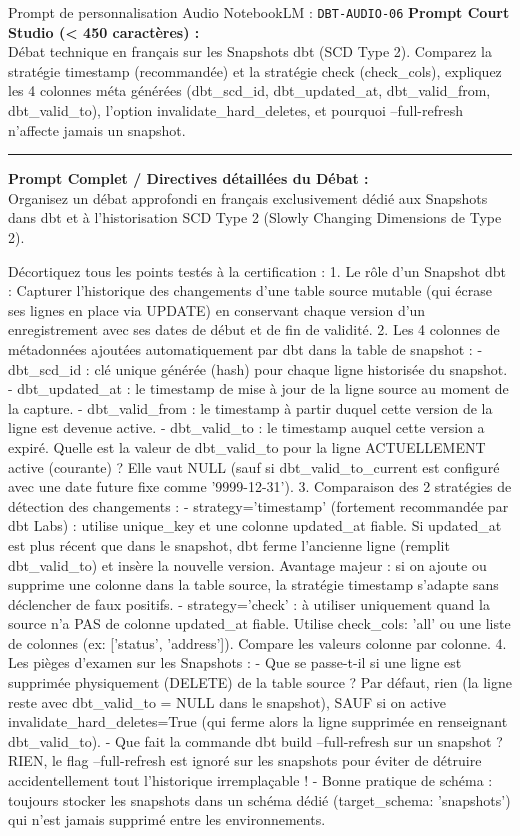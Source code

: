 \documentclass[11pt,a4paper]{article}
\begin{document}
\begin{promptbox}{Prompt de personnalisation Audio NotebookLM : \texttt{DBT-AUDIO-06}}
\textbf{Prompt Court Studio (< 450 caractères) :}\\
Débat technique en français sur les Snapshots dbt (SCD Type 2). Comparez la stratégie timestamp (recommandée) et la stratégie check (check\_cols), expliquez les 4 colonnes méta générées (dbt\_scd\_id, dbt\_updated\_at, dbt\_valid\_from, dbt\_valid\_to), l'option invalidate\_hard\_deletes, et pourquoi --full-refresh n'affecte jamais un snapshot.

\medskip\hrule\medskip
\textbf{Prompt Complet / Directives détaillées du Débat :}\\
Organisez un débat approfondi en français exclusivement dédié aux Snapshots dans dbt et à l'historisation SCD Type 2 (Slowly Changing Dimensions de Type 2).

Décortiquez tous les points testés à la certification :
1. Le rôle d'un Snapshot dbt :
Capturer l'historique des changements d'une table source mutable (qui écrase ses lignes en place via UPDATE) en conservant chaque version d'un enregistrement avec ses dates de début et de fin de validité.
2. Les 4 colonnes de métadonnées ajoutées automatiquement par dbt dans la table de snapshot :
- dbt\_scd\_id : clé unique générée (hash) pour chaque ligne historisée du snapshot.
- dbt\_updated\_at : le timestamp de mise à jour de la ligne source au moment de la capture.
- dbt\_valid\_from : le timestamp à partir duquel cette version de la ligne est devenue active.
- dbt\_valid\_to : le timestamp auquel cette version a expiré. Quelle est la valeur de dbt\_valid\_to pour la ligne ACTUELLEMENT active (courante) ? Elle vaut NULL (sauf si dbt\_valid\_to\_current est configuré avec une date future fixe comme '9999-12-31').
3. Comparaison des 2 stratégies de détection des changements :
- strategy='timestamp' (fortement recommandée par dbt Labs) : utilise unique\_key et une colonne updated\_at fiable. Si updated\_at est plus récent que dans le snapshot, dbt ferme l'ancienne ligne (remplit dbt\_valid\_to) et insère la nouvelle version. Avantage majeur : si on ajoute ou supprime une colonne dans la table source, la stratégie timestamp s'adapte sans déclencher de faux positifs.
- strategy='check' : à utiliser uniquement quand la source n'a PAS de colonne updated\_at fiable. Utilise check\_cols: 'all' ou une liste de colonnes (ex: ['status', 'address']). Compare les valeurs colonne par colonne.
4. Les pièges d'examen sur les Snapshots :
- Que se passe-t-il si une ligne est supprimée physiquement (DELETE) de la table source ? Par défaut, rien (la ligne reste avec dbt\_valid\_to = NULL dans le snapshot), SAUF si on active invalidate\_hard\_deletes=True (qui ferme alors la ligne supprimée en renseignant dbt\_valid\_to).
- Que fait la commande dbt build --full-refresh sur un snapshot ? RIEN, le flag --full-refresh est ignoré sur les snapshots pour éviter de détruire accidentellement tout l'historique irremplaçable !
- Bonne pratique de schéma : toujours stocker les snapshots dans un schéma dédié (target\_schema: 'snapshots') qui n'est jamais supprimé entre les environnements.
\end{promptbox}
\end{document}
